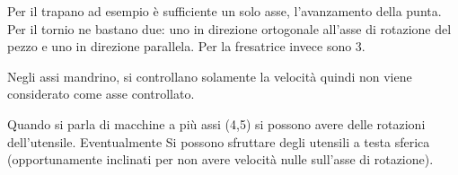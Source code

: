 Per il trapano ad esempio è sufficiente un solo asse, l'avanzamento della punta.
Per il tornio ne bastano due: uno in direzione ortogonale all'asse di rotazione del pezzo e uno in direzione 
parallela.
Per la fresatrice invece sono 3.

Negli assi mandrino, si controllano solamente la velocità quindi non viene considerato come asse controllato.

Quando si parla di macchine a più assi (4,5) si possono avere delle rotazioni dell'utensile.
Eventualmente Si possono sfruttare degli utensili a testa sferica (opportunamente inclinati per non avere 
velocità nulle sull'asse di rotazione).